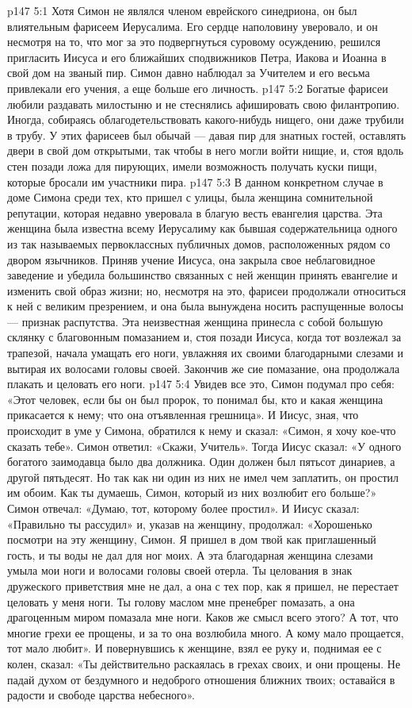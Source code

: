 \vs p147 5:1 Хотя Симон не являлся членом еврейского синедриона, он был влиятельным фарисеем Иерусалима. Его сердце наполовину уверовало, и он несмотря на то, что мог за это подвергнуться суровому осуждению, решился пригласить Иисуса и его ближайших сподвижников Петра, Иакова и Иоанна в свой дом на званый пир. Симон давно наблюдал за Учителем и его весьма привлекали его учения, а еще больше его личность.
\vs p147 5:2 Богатые фарисеи любили раздавать милостыню и не стеснялись афишировать свою филантропию. Иногда, собираясь облагодетельствовать какого\hyp{}нибудь нищего, они даже трубили в трубу. У этих фарисеев был обычай --- давая пир для знатных гостей, оставлять двери в свой дом открытыми, так чтобы в него могли войти нищие, и, стоя вдоль стен позади ложа для пирующих, имели возможность получать куски пищи, которые бросали им участники пира.
\vs p147 5:3 В данном конкретном случае в доме Симона среди тех, кто пришел с улицы, была женщина сомнительной репутации, которая недавно уверовала в благую весть евангелия царства. Эта женщина была известна всему Иерусалиму как бывшая содержательница одного из так называемых первоклассных публичных домов, расположенных рядом со двором язычников. Приняв учение Иисуса, она закрыла свое неблаговидное заведение и убедила большинство связанных с ней женщин принять евангелие и изменить свой образ жизни; но, несмотря на это, фарисеи продолжали относиться к ней с великим презрением, и она была вынуждена носить распущенные волосы --- признак распутства. Эта неизвестная женщина принесла с собой большую склянку с благовонным помазанием и, стоя позади Иисуса, когда тот возлежал за трапезой, начала умащать его ноги, увлажняя их своими благодарными слезами и вытирая их волосами головы своей. Закончив же сие помазание, она продолжала плакать и целовать его ноги.
\vs p147 5:4 Увидев все это, Симон подумал про себя: «Этот человек, если бы он был пророк, то понимал бы, кто и какая женщина прикасается к нему; что она отъявленная грешница». И Иисус, зная, что происходит в уме у Симона, обратился к нему и сказал: «Симон, я хочу кое\hyp{}что сказать тебе». Симон ответил: «Скажи, Учитель». Тогда Иисус сказал: «У одного богатого заимодавца было два должника. Один должен был пятьсот динариев, а другой пятьдесят. Но так как ни один из них не имел чем заплатить, он простил им обоим. Как ты думаешь, Симон, который из них возлюбит его больше?» Симон отвечал: «Думаю, тот, которому более простил». И Иисус сказал: «Правильно ты рассудил» и, указав на женщину, продолжал: «Хорошенько посмотри на эту женщину, Симон. Я пришел в дом твой как приглашенный гость, и ты воды не дал для ног моих. А эта благодарная женщина слезами умыла мои ноги и волосами головы своей отерла. Ты целования в знак дружеского приветствия мне не дал, а она с тех пор, как я пришел, не перестает целовать у меня ноги. Ты голову маслом мне пренебрег помазать, а она драгоценным миром помазала мне ноги. Каков же смысл всего этого? А тот, что многие грехи ее прощены, и за то она возлюбила много. А кому мало прощается, тот мало любит». И повернувшись к женщине, взял ее руку и, поднимая ее с колен, сказал: «Ты действительно раскаялась в грехах своих, и они прощены. Не падай духом от бездумного и недоброго отношения ближних твоих; оставайся в радости и свободе царства небесного».
